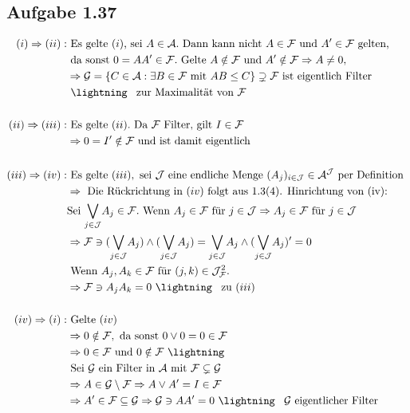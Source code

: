 \documentclass[10pt, a4paper]{article}
\begin{document}
\subsection{Aufgabe 1.37}
\begin{align*}
	(i)\Rightarrow(ii):& \text{ Es gelte } (i) \text{, sei } A\in\mathcal{A}. \text{ Dann kann nicht } A\in\mathcal{F} \text{ und } A'\in\mathcal{F}\text{ gelten,}	\\ 
	&\text{ da sonst } 0=AA'\in\mathcal{F}. \text{ Gelte } A\notin\mathcal{F}\text{ und } A'\notin\mathcal{F}\Rightarrow A\neq 0,	\\
	&\Rightarrow \mathcal{G}=\{C\in\mathcal{A}: \exists B\in\mathcal{F}\text{ mit }AB\leq C \}\supsetneq\mathcal{F}\text{ ist eigentlich Filter}	\\
	&\text{ \lightning \hspace{5pt}zur Maximalität von }\mathcal{F}	\\	
	\\
	(ii)\Rightarrow(iii):& \text{ Es gelte } (ii). \text{ Da } \mathcal{F}\text{ Filter, gilt } I\in\mathcal{F}	\\
	&\Rightarrow 0=I'\notin\mathcal{F} \text{ und ist damit eigentlich }	\\
	\\
	(iii)\Rightarrow(iv):& \text{ Es gelte } (iii), \text{ sei } \mathcal{J}\text{ eine endliche Menge } (A_{j})_{i\in\mathcal{J}}\in\mathcal{A}^{\mathcal{J}}\text{ per Definition }	\\
	&\Rightarrow \text{ Die Rückrichtung in }(iv)\text{ folgt aus 1.3(4). Hinrichtung von (iv):}	\\
	&\text{Sei }\underset{j\in\mathcal{J}}{\bigvee}A_{j}\in\mathcal{F}.	\text{ Wenn } A_{j}\in\mathcal{F}\text{ für }j\in\mathcal{J}\Rightarrow A_{j}\in\mathcal{F}\text{ für }j\in\mathcal{J}	\\
	&\Rightarrow \mathcal{F}\ni(\underset{j\in\mathcal{J}}{\bigvee}A_{j})\wedge(\underset{j\in\mathcal{J}}{\bigvee}A_{j})=\underset{j\in\mathcal{J}}{\bigvee}A_{j}\wedge(\underset{j\in\mathcal{J}}{\bigvee}A_{j})'=0	\\
	&\text{ Wenn } A_{j}, A_{k}\in\mathcal{F}\text{ für } (j,k)\in\mathcal{J}_{\mathcal{F}}^{2}.	\\
	&\Rightarrow\mathcal{F}\ni A_{j}A_{k}=0	\text{ \lightning \hspace{5pt}zu }(iii)	\\
	\\
	(iv)\Rightarrow(i):& \text{ Gelte } (iv)	\\
	&\Rightarrow 0\notin\mathcal{F}, \text{ da sonst } 0\vee0=0\in\mathcal{F}	\\
	&\Rightarrow 0\in\mathcal{F} \text{ und } 0\notin\mathcal{F} \text{ \lightning }	\\
	&\text{ Sei }\mathcal{G}\text{ ein Filter in }\mathcal{A}\text{ mit }\mathcal{F}\subsetneq\mathcal{G}	\\
	&\Rightarrow A\in\mathcal{G}\setminus\mathcal{F}\Rightarrow A\vee A'=I\in\mathcal{F}	\\
	&\Rightarrow A'\in\mathcal{F}\subseteq\mathcal{G}\Rightarrow\mathcal{G}\ni AA'=0 \text{ \lightning } \hspace{5pt} \mathcal{G} \text{ eigentlicher Filter }
\end{align*}
\end{document}
